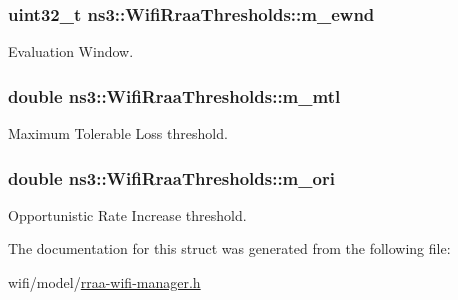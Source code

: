 \subsubsection[{\texorpdfstring{m\+\_\+ewnd}{m_ewnd}}]{\setlength{\rightskip}{0pt plus 5cm}uint32\+\_\+t ns3\+::\+Wifi\+Rraa\+Thresholds\+::m\+\_\+ewnd}\hypertarget{structns3_1_1WifiRraaThresholds_a583f54fbc0a1b878fb63a602b79c4c37}{}\label{structns3_1_1WifiRraaThresholds_a583f54fbc0a1b878fb63a602b79c4c37}


Evaluation Window. 

\subsubsection[{\texorpdfstring{m\+\_\+mtl}{m_mtl}}]{\setlength{\rightskip}{0pt plus 5cm}double ns3\+::\+Wifi\+Rraa\+Thresholds\+::m\+\_\+mtl}\hypertarget{structns3_1_1WifiRraaThresholds_a12c6b09aab59c6176e01d82aec721edc}{}\label{structns3_1_1WifiRraaThresholds_a12c6b09aab59c6176e01d82aec721edc}


Maximum Tolerable Loss threshold. 

\subsubsection[{\texorpdfstring{m\+\_\+ori}{m_ori}}]{\setlength{\rightskip}{0pt plus 5cm}double ns3\+::\+Wifi\+Rraa\+Thresholds\+::m\+\_\+ori}\hypertarget{structns3_1_1WifiRraaThresholds_ad5cbc663fec23b90226f9ba07fd26d08}{}\label{structns3_1_1WifiRraaThresholds_ad5cbc663fec23b90226f9ba07fd26d08}


Opportunistic Rate Increase threshold. 



The documentation for this struct was generated from the following file\+:\begin{DoxyCompactItemize}
\item 
wifi/model/\hyperlink{rraa-wifi-manager_8h}{rraa-\/wifi-\/manager.\+h}\end{DoxyCompactItemize}
